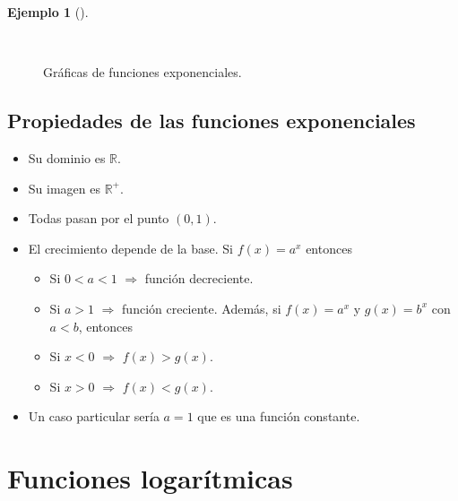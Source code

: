 \documentclass[
  a4paper,
]{scrreport}
\providecommand{\tightlist}{%
  \setlength{\itemsep}{0pt}\setlength{\parskip}{0pt}}\usepackage{longtable,booktabs,array}
\theoremstyle{plain}
\theoremstyle{plain}
\theoremstyle{definition}
\theoremstyle{plain}
\theoremstyle{definition}
\newtheorem{example}{Ejemplo}[chapter]
\theoremstyle{remark}
\begin{document}
\leavevmode{}%
\begin{example}[]\label{exm-funcion-exponencial}

~

\begin{figure}

{\centering 



}

\caption{Gráficas de funciones exponenciales.}

\end{figure}

\end{example}

\hypertarget{propiedades-de-las-funciones-exponenciales}{%
\subsection{Propiedades de las funciones
exponenciales}\label{propiedades-de-las-funciones-exponenciales}}

\begin{itemize}
\tightlist
\item
  Su dominio es \(\mathbb{R}\).
\item
  Su imagen es \(\mathbb{R}^+\).
\item
  Todas pasan por el punto \((0,1)\).
\item
  El crecimiento depende de la base. Si \(f(x)=a^x\) entonces

  \begin{itemize}
  \tightlist
  \item
    Si \(0<a<1\) \(\Rightarrow\) función decreciente.
  \item
    Si \(a>1\) \(\Rightarrow\) función creciente. Además, si
    \(f(x)=a^x\) y \(g(x)=b^x\) con \(a<b\), entonces
  \item
    Si \(x<0\) \(\Rightarrow\) \(f(x)>g(x)\).
  \item
    Si \(x>0\) \(\Rightarrow\) \(f(x)<g(x)\).
  \end{itemize}
\item
  Un caso particular sería \(a=1\) que es una función constante.
\end{itemize}

\hypertarget{funciones-logaruxedtmicas}{%
\section{Funciones logarítmicas}\label{funciones-logaruxedtmicas}}
\end{document}
